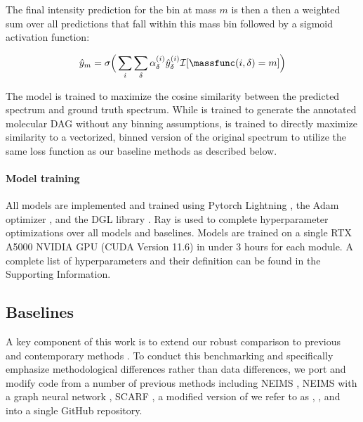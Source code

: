 \documentclass[journal=jcim,manuscript=article]{achemso}
\begin{document}
The final intensity prediction for the bin at mass $m$ is then a then a weighted sum over all predictions that fall within this mass bin followed by a sigmoid activation function:

\begin{equation}
    \hat{y}_m = \sigma \Big(\sum_{i}  \sum_\delta \alpha^{(i)}_{\delta} \hat{y}^{(i)}_{\delta} \mathcal{I}[\massfunc(i,\delta) = m] \Big)
\end{equation}

The model is trained to maximize the cosine similarity between the predicted spectrum and ground truth spectrum. While \ourModel \ourModelOneShort is trained to generate the annotated molecular DAG without any binning assumptions, \ourModel \ourModelTwoShort is trained to directly maximize similarity to a vectorized, binned version of the original spectrum to utilize the same loss function as our baseline methods as described below.


\paragraph{Model training} All models are implemented and trained using Pytorch Lightning \cite{Falcon_PyTorch_Lightning_2019}, the Adam optimizer \cite{kingma2014adam}, and the 
 DGL library \cite{Wang2019-ga}. Ray\cite{liaw2018tune} is used to complete hyperparameter optimizations over all models and baselines. 
Models are trained on a single RTX A5000 NVIDIA GPU (CUDA Version 11.6) in under $3$ hours for each module. A complete list of hyperparameters and their definition can be found in the Supporting Information.

\subsection{Baselines}
\label{sec:methods_baselines}

A key component of this work is to extend our robust comparison to previous and contemporary methods \cite{goldman_prefix-tree_2023}. To conduct this benchmarking and specifically emphasize methodological differences rather than data differences, we port and modify code from a number of previous methods including NEIMS \cite{wei_rapid_2019}, NEIMS with a graph neural network \cite{zhu_using_2020} \MolMS \cite{hong20233DMolMS}, SCARF \cite{goldman_prefix-tree_2023}, a modified version of \graffMS we refer to as \FixedVocab \cite{murphy2023efficiently}, \Massformer \cite{young_Massformer_2021}, and \cfmModel \cite{wang_cfm-id_2021} into a single GitHub repository. 
\end{document}

